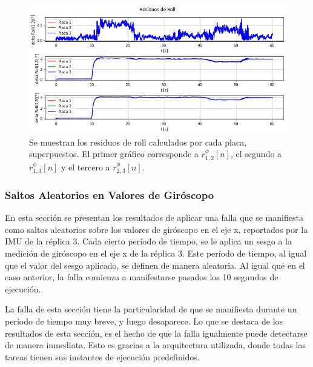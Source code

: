 \begin{figure}[htb]
    \centering
    \includegraphics[width=\textwidth]{img/resultados_residuos_roll_bias_giroscopo.png}
    \caption{Se muestran los residuos de roll calculados por cada placa, superpuestos. El primer gráfico corresponde a $r_{1,2}^{\phi}[n]$, el segundo a $r_{1,3}^{\phi}[n]$ y el tercero a $r_{2,3}^{\phi}[n]$.}
    \label{fig:resultados_residuos_roll_bias_giroscopo}
\end{figure}


\subsubsection{Saltos Aleatorios en Valores de Giróscopo}

En esta sección se presentan los resultados de aplicar una falla que se manifiesta como saltos aleatorios sobre los valores de giróscopo en el eje x, reportados por la IMU de la réplica 3. Cada cierto período de tiempo, se le aplica un sesgo a la medición de giróscopo en el eje x de la réplica 3. Este período de tiempo, al igual que el valor del sesgo aplicado, se definen de manera aleatoria. Al igual que en el caso anterior, la falla comienza a manifestarse pasados los 10 segundos de ejecución.

La falla de esta sección tiene la particularidad de que se manifiesta durante un período de tiempo muy breve, y luego desaparece. Lo que se destaca de los resultados de esta sección, es el hecho de que la falla igualmente puede detectarse de manera inmediata. Esto es gracias a la arquitectura utilizada, donde todas las tareas tienen sus instantes de ejecución predefinidos.

